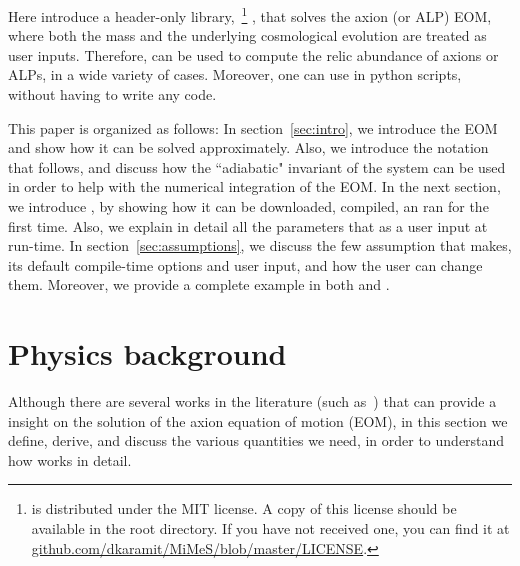 \documentclass[11pt,a4paper]{article}
\begin{document}
Here introduce a header-only \CPP library,~\footnote{\mimes is distributed under the MIT license. A copy of this license should be available in the \mimes root directory. If you have not received one, you can find it at  \href{https://github.com/dkaramit/MiMeS/blob/master/LICENSE}{github.com/dkaramit/MiMeS/blob/master/LICENSE}.} \mimes, that solves the axion (or ALP) EOM, where both the mass and the underlying cosmological evolution are treated as user inputs. Therefore, \mimes can be used to compute the relic abundance of axions or ALPs, in a wide variety of cases. Moreover, one can use \mimes in python scripts, without having to write any \CPP code.

This paper is organized as follows: 
%
In section~\ref{sec:intro}, we introduce the EOM and show how it can be solved approximately. Also, we introduce the notation that \mimes follows, and discuss how the ``adiabatic" invariant of the system can be used in order to help with the numerical integration of the EOM. 
%
In the next section, we introduce \mimes, by showing how it can be downloaded, compiled, an ran for the first time. Also, we explain in detail all the parameters that \mimes as a user input at run-time.
%
In section~\ref{sec:assumptions}, we discuss the few assumption that \mimes makes, its default compile-time options and user input, and how the user can change them. Moreover, we provide a complete example in both \CPP and \PY. 

\section{Physics background}\label{sec:Physics}
\setcounter{equation}{0}
%
Although there are several works in the literature (such as~\cite{Chang:1998ys}) that can provide a insight on the solution of the axion equation of motion (EOM), in this section we define, derive, and discuss the various quantities we need, in order to understand how \mimes works in detail.
\end{document}
